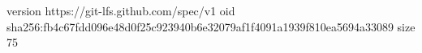 version https://git-lfs.github.com/spec/v1
oid sha256:fb4c67fdd096e48d0f25c923940b6e32079af1f4091a1939f810ea5694a33089
size 75
